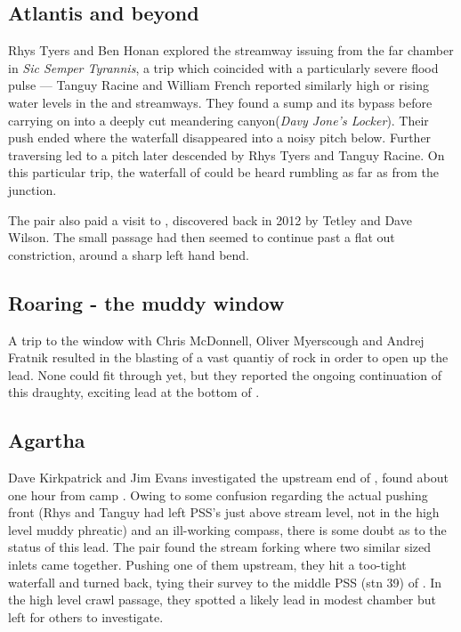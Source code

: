 \subsection{Atlantis and beyond}
Rhys Tyers and Ben Honan explored the streamway issuing from the far chamber in \emph{Sic Semper Tyrannis}, a trip which coincided with a particularly severe flood pulse --- Tanguy Racine and William French reported similarly high or rising water levels in the  and  streamways. They found a sump and its bypass before carrying on into a deeply cut meandering canyon(\emph{Davy Jone's Locker}). Their push ended where the waterfall disappeared into a noisy pitch below. Further traversing led to a pitch later descended by Rhys Tyers and Tanguy Racine. On this particular trip, the waterfall of  could be heard rumbling as far as from the  junction. 

The pair also paid a visit to , discovered back in 2012 by Tetley and Dave Wilson. The small passage had then seemed to continue past a flat out constriction, around a sharp left hand bend. 

\subsection{Roaring - the muddy window}
A trip to the  window with Chris McDonnell, Oliver Myerscough and Andrej Fratnik resulted in the blasting of a vast quantiy of rock in order to open up the lead. None could fit through yet, but they reported the ongoing continuation of this draughty, exciting lead at the bottom of .


\subsection{Agartha}
Dave Kirkpatrick and Jim Evans investigated the upstream end of , found about one hour from camp . Owing to some confusion regarding the actual pushing front (Rhys and Tanguy had left PSS's just above stream level, not in the high level muddy phreatic) and an ill-working compass, there is some doubt as to the status of this lead. The pair found the stream forking where two similar sized inlets came together. Pushing one of them upstream, they hit a too-tight waterfall and turned back, tying their survey to the middle PSS (stn 39) of . In the high level crawl passage, they spotted a likely lead in modest chamber but left for others to investigate.



